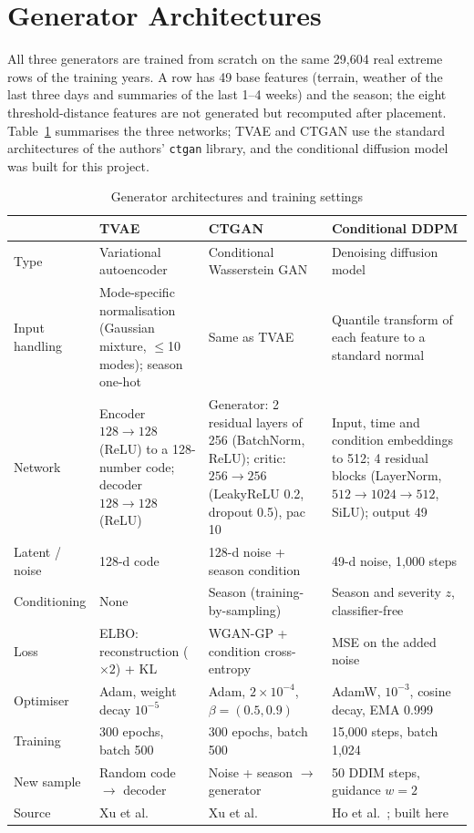 \documentclass[12pt,a4paper]{report}
\begin{document}
\section{Generator Architectures}
\label{sec:arch}
All three generators are trained from scratch on the same 29{,}604 real extreme rows of the training years. A row has
49 base features (terrain, weather of the last three days and summaries of the last 1--4 weeks) and the season; the
eight threshold-distance features are not generated but recomputed after placement. Table~\ref{tab:arch} summarises
the three networks; TVAE and CTGAN use the standard architectures of the authors' \texttt{ctgan} library, and the
conditional diffusion model was built for this project.

\begin{table}[H]
\centering
\caption{Generator architectures and training settings}
\label{tab:arch}
\footnotesize
\begin{tabularx}{\textwidth}{|l|X|X|X|}
\hline
 & \textbf{TVAE} & \textbf{CTGAN} & \textbf{Conditional DDPM}\\ \hline
Type & Variational autoencoder & Conditional Wasserstein GAN & Denoising diffusion model\\ \hline
Input handling & Mode-specific normalisation (Gaussian mixture, $\le$10 modes); season one-hot & Same as TVAE & Quantile transform of each feature to a standard normal\\ \hline
Network & Encoder $128\!\to\!128$ (ReLU) to a 128-number code; decoder $128\!\to\!128$ (ReLU) & Generator: 2 residual layers of 256 (BatchNorm, ReLU); critic: $256\!\to\!256$ (LeakyReLU 0.2, dropout 0.5), pac 10 & Input, time and condition embeddings to 512; 4 residual blocks (LayerNorm, $512\!\to\!1024\!\to\!512$, SiLU); output 49\\ \hline
Latent / noise & 128-d code & 128-d noise + season condition & 49-d noise, 1{,}000 steps\\ \hline
Conditioning & None & Season (training-by-sampling) & Season and severity $z$, classifier-free\\ \hline
Loss & ELBO: reconstruction ($\times2$) + KL & WGAN-GP + condition cross-entropy & MSE on the added noise\\ \hline
Optimiser & Adam, weight decay $10^{-5}$ & Adam, $2\!\times\!10^{-4}$, $\beta=(0.5,0.9)$ & AdamW, $10^{-3}$, cosine decay, EMA 0.999\\ \hline
Training & 300 epochs, batch 500 & 300 epochs, batch 500 & 15{,}000 steps, batch 1{,}024\\ \hline
New sample & Random code $\to$ decoder & Noise + season $\to$ generator & 50 DDIM steps, guidance $w=2$\\ \hline
Source & Xu et al.~\cite{xu2019ctgan} & Xu et al.~\cite{xu2019ctgan} & Ho et al.~\cite{ho2020ddpm}; built here\\ \hline
\end{tabularx}
\end{table}
\end{document}
